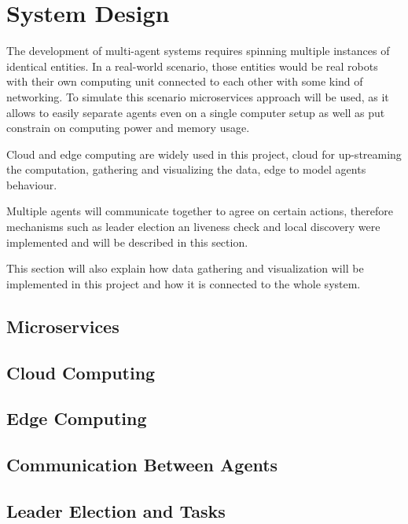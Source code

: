 \chapter{System Design}
The development of multi-agent systems requires spinning multiple instances of identical entities. In a real-world scenario, those entities would be real robots with their own computing unit connected to each other with some kind of networking. To simulate this scenario microservices approach will be used, as it allows to easily separate agents even on a single computer setup as well as put constrain on computing power and memory usage.

Cloud and edge computing are widely used in this project, cloud for up-streaming the computation, gathering and visualizing the data, edge to model agents behaviour.

Multiple agents will communicate together to agree on certain actions, therefore mechanisms such as leader election an liveness check and local discovery were implemented and will be described in this section.

This section will also explain how data gathering and visualization will be implemented in this project and how it is connected to the whole system.
\section{Microservices}


\section{Cloud Computing}


\section{Edge Computing}


\section{Communication Between Agents}


\section{Leader Election and Tasks}



